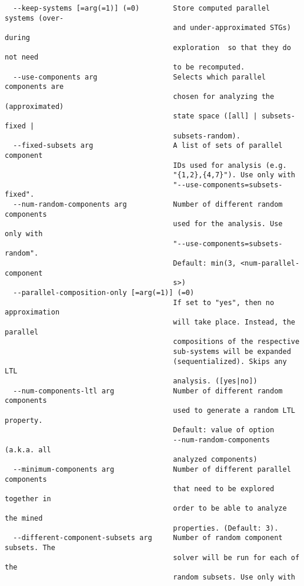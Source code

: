 \documentclass[natbib]{article}
\begin{document}
\begin{verbatim}
  --keep-systems [=arg(=1)] (=0)        Store computed parallel systems (over- 
                                        and under-approximated STGs) during 
                                        exploration  so that they do not need 
                                        to be recomputed.
  --use-components arg                  Selects which parallel components are 
                                        chosen for analyzing the (approximated)
                                        state space ([all] | subsets-fixed | 
                                        subsets-random).
  --fixed-subsets arg                   A list of sets of parallel component 
                                        IDs used for analysis (e.g. 
                                        "{1,2},{4,7}"). Use only with 
                                        "--use-components=subsets-fixed".
  --num-random-components arg           Number of different random components 
                                        used for the analysis. Use only with 
                                        "--use-components=subsets-random". 
                                        Default: min(3, <num-parallel-component
                                        s>)
  --parallel-composition-only [=arg(=1)] (=0)
                                        If set to "yes", then no approximation 
                                        will take place. Instead, the parallel 
                                        compositions of the respective 
                                        sub-systems will be expanded 
                                        (sequentialized). Skips any LTL 
                                        analysis. ([yes|no])
  --num-components-ltl arg              Number of different random components 
                                        used to generate a random LTL property.
                                        Default: value of option 
                                        --num-random-components (a.k.a. all 
                                        analyzed components)
  --minimum-components arg              Number of different parallel components
                                        that need to be explored together in 
                                        order to be able to analyze the mined 
                                        properties. (Default: 3).
  --different-component-subsets arg     Number of random component subsets. The
                                        solver will be run for each of the 
                                        random subsets. Use only with 

\end{verbatim}
\end{document}
